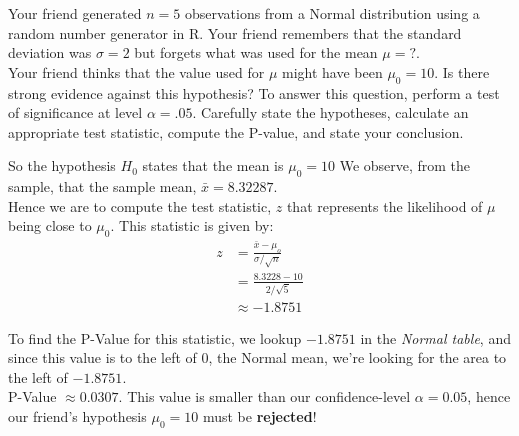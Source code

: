 \documentclass[boxes, qed]{homework}
\begin{document}
\begin{problem}Your friend generated $n=5$ observations from a Normal distribution using a random number
  generator in R. Your friend remembers that the standard deviation was $\sigma=2$ but forgets what was used
  for the mean $\mu=?$.\\
  Your friend thinks that the value used for $\mu$ might have been $\mu_0=10$. 
  Is there strong evidence against this hypothesis? To answer this question, perform a test of significance 
  at level $\alpha=.05$. Carefully state the hypotheses, calculate an appropriate test statistic, 
  compute the P-value, and state your conclusion.
\end{problem}
\begin{solution}
  So the hypothesis $H_0$ states that the mean is $\mu_0=10$
  We observe, from the sample, that the sample mean, $\bar{x}=8.32287$.\\
  
  Hence we are to compute the test statistic, $z$ that represents
  the likelihood of $\mu$ being close to $\mu_0$. This statistic
  is given by:
  \begin{align*}
    z&=\frac{\bar{x}-\mu_o}{\sigma/\sqrt{n}}\\
    &= \frac{8.3228-10}{2/\sqrt{5}}\\
    &\approx -1.8751
  \end{align*}

  To find the P-Value for this statistic, we lookup $-1.8751$
  in the \textit{Normal table}, and since this value is to the left of $0$,
  the Normal mean, we're looking for the area to the left of $-1.8751$.\\

  P-Value $\approx 0.0307$. This value is smaller than our confidence-level
  $\alpha=0.05$, hence our friend's hypothesis $\mu_0=10$ must be \textbf{rejected}!
\end{solution}
\end{document}

